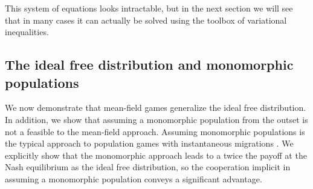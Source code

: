 This system of equations looks intractable, but in the next section we will see that in many cases it can actually be solved using the toolbox of variational inequalities.



\subsection{The ideal free distribution and monomorphic populations}
We now demonstrate that mean-field games generalize the ideal free distribution. In addition, we show that assuming a monomorphic population from the outset is not a feasible to the mean-field approach. Assuming monomorphic populations is the typical approach to population games with instantaneous migrations  \citep{kvrivan2013behavioral, vincent2005evolutionary}. We explicitly show that the monomorphic approach leads to a twice the payoff at the Nash equilibrium as the ideal free distribution, so the cooperation implicit in assuming a monomorphic population conveys a significant advantage.




